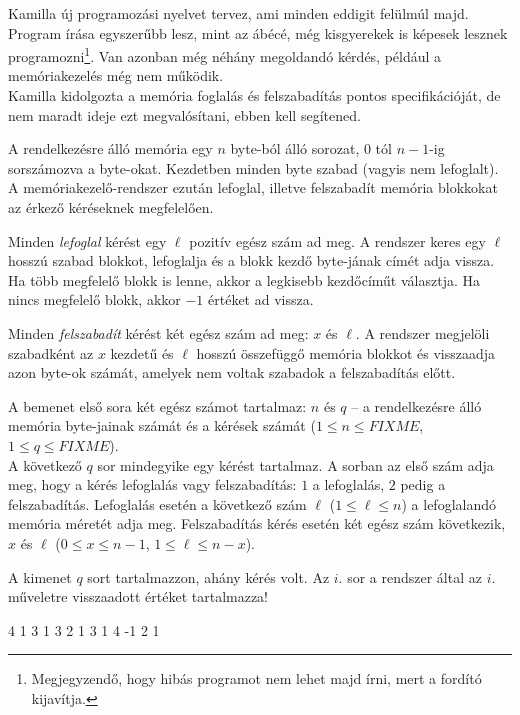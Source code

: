 




Kamilla új programozási nyelvet tervez, ami minden eddigit felülmúl majd. Program írása egyszerűbb lesz, mint az ábécé, még kisgyerekek is képesek lesznek programozni\footnote{Megjegyzendő, hogy hibás programot nem lehet majd írni, mert a fordító kijavítja.}. Van azonban még néhány megoldandó kérdés, például a memóriakezelés még nem működik. \\
Kamilla kidolgozta a memória foglalás és felszabadítás pontos specifikációját, de nem maradt ideje ezt megvalósítani, ebben kell segítened.

A rendelkezésre álló memória egy $n$ byte-ból álló sorozat,  $0$ tól $n-1$-ig sorszámozva a byte-okat. Kezdetben minden byte szabad (vagyis nem lefoglalt). A memóriakezelő-rendszer ezután lefoglal, illetve felszabadít memória blokkokat az érkező kéréseknek megfelelően.

Minden \emph{lefoglal} kérést egy $\ell$ pozitív egész szám ad meg. A rendszer keres egy $\ell$ hosszú szabad blokkot, lefoglalja és a blokk kezdő byte-jának címét adja vissza. Ha több megfelelő blokk is lenne, akkor a legkisebb kezdőcíműt választja. Ha nincs megfelelő blokk, akkor $-1$ értéket ad vissza.

Minden \emph{felszabadít} kérést két egész szám ad meg: $x$ és $\ell$. A rendszer megjelöli szabadként az $x$ kezdetű és $\ell$ hosszú összefüggő memória blokkot és visszaadja azon byte-ok számát, amelyek nem voltak szabadok a felszabadítás előtt.


A bemenet első sora két egész számot tartalmaz: $n$ és $q$ -- a rendelkezésre álló memória byte-jainak számát és a kérések számát  ($1 \leq n \leq FIXME$, $1 \leq q \leq FIXME$).\\
A következő $q$ sor mindegyike egy kérést tartalmaz. A sorban az első szám adja meg, hogy a kérés lefoglalás vagy felszabadítás: $1$ a lefoglalás, $2$ pedig a felszabadítás. Lefoglalás esetén a következő szám $\ell$ ($1 \leq \ell \leq n$) a lefoglalandó memória méretét adja meg. Felszabadítás kérés esetén két egész szám következik, $x$ és $\ell$ ($0 \leq x \leq n-1$, $1 \leq \ell \leq n-x$).



 A kimenet $q$ sort tartalmazzon, ahány kérés volt. Az $i$. sor a rendszer által az $i$.  műveletre visszaadott értéket tartalmazza!


 4
1 3
1 3
2 1 3
1 4
-1
2
1
\sampleEND



